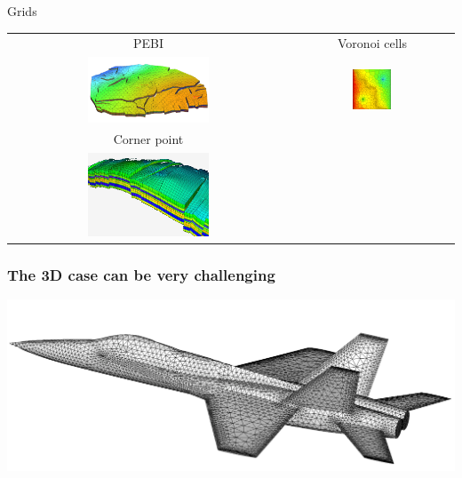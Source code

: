 \documentclass[handout]{beamer}
{
\usepackage{fullpage}
\usepackage{hyperref}
\usepackage{amssymb} 
}
\begin{document}
\begin{frame}{Grids}
\begin{tabular}{cc}
PEBI          & Voronoi cells \\
\includegraphics[width=0.45\textwidth]{figures/PEBI1.png}
&
\includegraphics[width=0.25\textwidth]{figures/voronoi-cells2D.png} \\
Corner point &      \\
\includegraphics[width=0.45\textwidth]{figures/CPGgridm.png}
&
\end{tabular}
\end{frame}

\begin{frame}
\frametitle{The 3D case can be very challenging}
\includegraphics[width=\textwidth]{figures/F17.png}
\end{frame}
\end{document}
